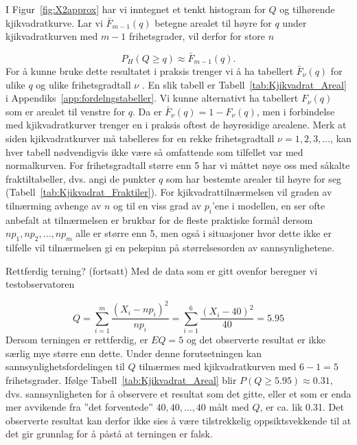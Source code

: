 \noindent I Figur~\ref{fig:X2approx} har vi inntegnet et tenkt histogram for $Q$ og
tilhørende kji\-kvadratkurve. Lar vi $ \bar{F}_{m-1}(q)$ betegne
arealet til høyre for $q$ under kji\-kvadratkurven med $m-1$
frihetsgrader, vil derfor for store $n$

\[ P_H(Q\geq q)\approx  \bar{F}_{m-1}(q). \]
For å kunne bruke dette resultatet i praksis trenger vi å ha
tabellert $\bar{F}_{\nu}(q)$ for ulike $q$ og ulike frihetsgradtall
 $\nu$ . En slik tabell er Tabell~\ref{tab:Kjikvadrat_Areal} i Appendiks~\ref{app:fordelngstabeller}. Vi kunne
alternativt ha tabellert  $F_{\nu}(q)$  som er arealet til venstre
for $q$. Da er  $\bar{F}_{\nu}(q)=1- F_{\nu}(q)$, men i forbindelse med
kjikvadratkurver trenger en i praksis oftest de høyresidige
arealene. Merk at siden kji\-kvadratkurver må tabelleres for en
rekke frihetsgradtall $\nu = 1,2,3,\ldots$, kan hver tabell
nødvendigvis ikke være så omfattende som tilfellet var med
normalkurven. For frihetsgradtall større enn 5 har vi måttet nøye
oss med såkalte fraktiltabeller, dvs. angi de punkter $q$ som har
bestemte arealer til høyre for seg (Tabell~\ref{tab:Kjikvadrat_Fraktiler}).
For kjikvadrattilnærmelsen vil graden av tilnærming avhenge av
$n$ og til en viss grad av $p_i$'ene i modellen, en ser ofte
anbefalt at tilnærmelsen er brukbar for de fleste praktiske
formål dersom $np_1, np_2, \ldots , np_m$ alle er større enn 5, men
også i situasjoner hvor dette ikke er tilfelle vil tilnærmelsen
gi en pekepinn på størrelsesorden av sannsynlighetene. \\

\addtocounter{eksecount}{-1}
\begin{eksempel}{Rettferdig terning? (fortsatt)}
Med de data som er gitt ovenfor beregner vi testobservatoren

\[ Q=\sum_{i=1}^{m}\frac{{(X_i-np_i)}^2}{np_i} =
          \sum_{i=1}^{6}\frac{{(X_i-40)}^2}{40}=5.95 \] 
Dersom terningen er rettferdig, er $EQ=5$ og det observerte
resultat er ikke særlig mye større enn dette. Under denne
forutsetningen kan sannsynlighetsfordelingen til $Q$ tilnærmes
med kjikvadratkurven med $6-1=5$ frihetsgrader. 
Ifølge Tabell~\ref{tab:Kjikvadrat_Areal} blir $P(Q\geq 5.95)\approx 0.31$, dvs. sannsynligheten for å
observere et resultat som det gitte, eller et som er enda mer
avvikende fra ''det forventede'' $40,40,\ldots ,40$ målt med $Q$, er
ca. lik 0.31. Det observerte resultat kan derfor ikke sies å
være tilstrekkelig oppsikts\-vekkende til at det gir grunnlag for å
påstå at terningen er falsk.\\
\end{eksempel}

